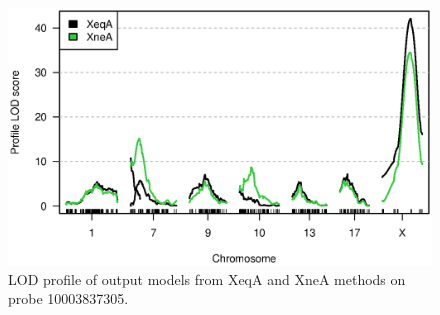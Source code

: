 \documentclass[12pt,letterpaper]{article}
\begin{document}
\clearpage
\begin{figure}
\centering
\includegraphics[width=\textwidth]{Figs/fig_prob305.eps}

\vspace{0cm}

\caption{LOD profile of output models from XeqA and XneA methods
  on probe 10003837305.
\label{fig:probe305}}
\end{figure}
\end{document}
